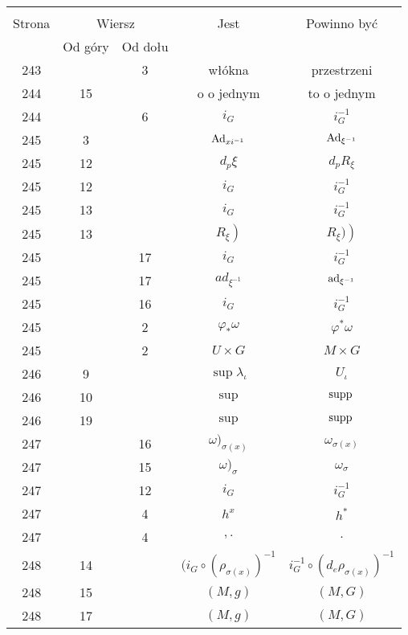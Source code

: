 \documentclass[a4paper,11pt]{article}
\begin{document}
\begin{center}
  \begin{tabular}{|c|c|c|c|c|}
    \hline
    & \multicolumn{2}{c|}{} & & \\
    Strona & \multicolumn{2}{c|}{Wiersz} & Jest
                              & Powinno być \\ \cline{2-3}
    & Od góry & Od dołu & & \\
    \hline
    243 & &  3 & włókna & przestrzeni \\
    244 & 15 & & o o jednym & to o jednym \\
    244 & &  6 & $i_{ G }$ & $i^{ -1 }_{ G }$ \\
    245 &  3 & & $\mathrm{Ad}_{ xi^{ -1 } }$ & $\mathrm{Ad}_{ \xi^{ -1 } }$ \\
    245 & 12 & & $d_{ p } \xi$ & $d_{ p } R_{ \xi }$ \\
    245 & 12 & & $i_{ G }$ & $i_{ G }^{ -1 }$ \\
    245 & 13 & & $i_{ G }$ & $i_{ G }^{ -1 }$ \\
    245 & 13 & & $\left. R_{ \xi } \right)$ & $\left. R_{ \xi } ) \right)$ \\
    245 & & 17 & $i_{ G }$ & $i_{ G }^{ -1 }$ \\
    245 & & 17 & $ad_{ \xi^{ -1 } }$ & $\mathrm{ad}_{ \xi^{ -1 } }$ \\
    245 & & 16 & $i_{ G }$ & $i_{ G }^{ -1 }$ \\
    245 & &  2 & $\varphi_{ * } \omega$ & $\varphi^{ * } \omega$ \\
    245 & &  2 & $U \times G$ & $M \times G$ \\
    246 &  9 & & $\sup \lambda_{ \iota }$ & $U_{ \iota }$ \\
    246 & 10 & & $\sup$ & $\mathrm{supp}\,$ \\
    246 & 19 & & $\sup$ & $\mathrm{supp}\,$ \\
    247 & & 16 & $\omega )_{ \sigma( x ) }$ & $\omega_{ \sigma( x ) }$ \\
    247 & & 15 & $\omega )_{ \sigma }$ & $\omega_{ \sigma }$ \\
    247 & & 12 & $i_{ G }$ & $i_{ G }^{ -1 }$ \\
    247 & &  4 & $h^{ x }$ & $h^{ * }$ \\
    247 & &  4 & $, .$ & $.$ \\
    248 & 14 & & $( i_{ G } \circ ( \rho_{ \sigma( x ) } )^{ -1 }$
           & $i_{ G }^{ -1 } \circ ( d_{ e }\rho_{ \sigma( x ) } )^{ -1 }$ \\
    248 & 15 & & $( M, g )$ & $( M, G )$ \\
    248 & 17 & & $( M, g )$ & $( M, G )$ \\

\end{tabular}
\end{center}
\end{document}
